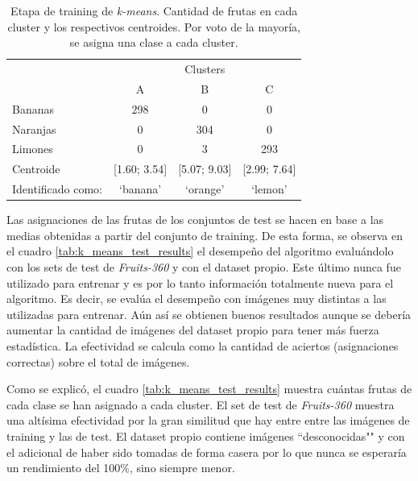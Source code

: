 \documentclass[10pt, a4paper]{article}
\begin{document}
\begin{table}[h]
\caption{Etapa de training de \textit{k-means}. Cantidad de frutas en cada cluster y los respectivos centroides. Por voto de la mayoría, se asigna una clase a cada cluster.}
\begin{center}
\begin{tabular}{|l|c|c|c|}
\hline
\multirow{2}{*}{}  & \multicolumn{3}{c|}{Clusters}                          \\ \cline{2-4} 
                   & A                & B                & C                \\ \hline
Bananas            & 298              & 0                & 0                \\ \hline
Naranjas           & 0                & 304              & 0                \\ \hline
Limones            & 0                & 3                & 293              \\ \hline
Centroide          & {[}1.60; 3.54{]} & {[}5.07; 9.03{]} & {[}2.99; 7.64{]} \\ \hline
Identificado como: & `banana'         & `orange'         & `lemon'          \\ \hline
\end{tabular}
\label{tab:k_means_clusters}
\end{center}
\end{table}

Las asignaciones de las frutas de los conjuntos de test se hacen en base a las medias obtenidas a partir del conjunto de training. De esta forma, se observa en el cuadro \ref{tab:k_means_test_results} el desempeño del algoritmo evaluándolo con los sets de test de \textit{Fruits-360} y con el dataset propio. Este último nunca fue utilizado para entrenar y es por lo tanto información totalmente nueva para el algoritmo. Es decir, se evalúa el desempeño con imágenes muy distintas a las utilizadas para entrenar. Aún así se obtienen buenos resultados aunque se debería aumentar la cantidad de imágenes del dataset propio para tener más fuerza estadística. La efectividad se calcula como la cantidad de aciertos (asignaciones correctas) sobre el total de imágenes.

Como se explicó, el cuadro \ref{tab:k_means_test_results} muestra cuántas frutas de cada clase se han asignado a cada cluster. El set de test de \textit{Fruits-360} muestra una altísima efectividad por la gran similitud que hay entre entre las imágenes de training y las de test. El dataset propio contiene imágenes ``desconocidas"" y con el adicional de haber sido tomadas de forma casera por lo que nunca se esperaría un rendimiento del 100\%, sino siempre menor.
\end{document}
